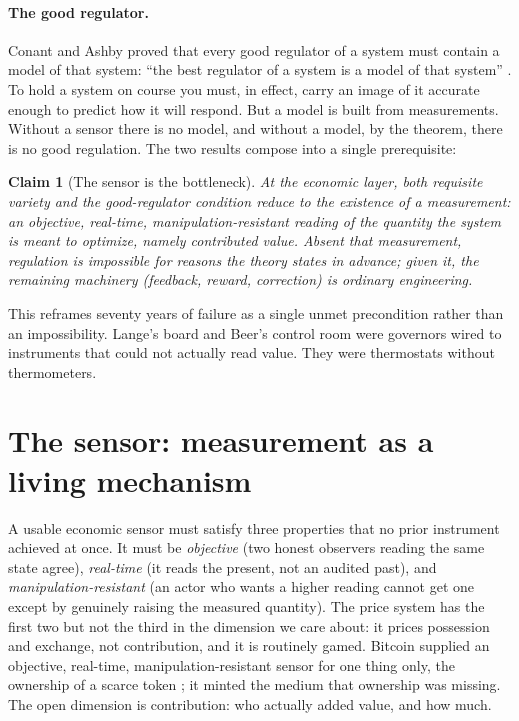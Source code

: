 \documentclass[10pt]{article}
\newtheorem{claim}{Claim}
\begin{document}
\paragraph{The good regulator.} Conant and Ashby proved that every good regulator of a system must
contain a model of that system: ``the best regulator of a system is a model of that system''
\cite{conant1970}. To hold a system on course you must, in effect, carry an image of it accurate enough
to predict how it will respond. But a model is built from measurements. Without a sensor there is no
model, and without a model, by the theorem, there is no good regulation. The two results compose into a
single prerequisite:

\begin{claim}[The sensor is the bottleneck]
At the economic layer, both requisite variety and the good-regulator condition reduce to the existence
of a measurement: an objective, real-time, manipulation-resistant reading of the quantity the system is
meant to optimize, namely contributed value. Absent that measurement, regulation is impossible for
reasons the theory states in advance; given it, the remaining machinery (feedback, reward, correction)
is ordinary engineering.
\end{claim}

This reframes seventy years of failure as a single unmet precondition rather than an impossibility. Lange's
board and Beer's control room were governors wired to instruments that could not actually read value. They
were thermostats without thermometers.

\section{The sensor: measurement as a living mechanism}

A usable economic sensor must satisfy three properties that no prior instrument achieved at once. It must
be \emph{objective} (two honest observers reading the same state agree), \emph{real-time} (it reads the
present, not an audited past), and \emph{manipulation-resistant} (an actor who wants a higher reading
cannot get one except by genuinely raising the measured quantity). The price system has the first two but
not the third in the dimension we care about: it prices possession and exchange, not contribution, and it
is routinely gamed. Bitcoin supplied an objective, real-time, manipulation-resistant sensor for one thing
only, the ownership of a scarce token \cite{nakamoto2008}; it minted the medium that ownership was missing.
The open dimension is contribution: who actually added value, and how much.
\end{document}
